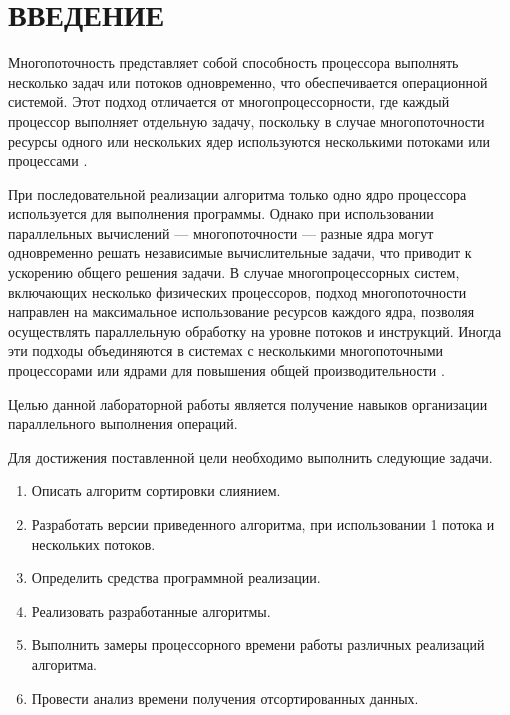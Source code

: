\chapter*{\hfill{\centering  ВВЕДЕНИЕ}\hfill}

Многопоточность представляет собой способность процессора выполнять несколько задач или потоков одновременно, что обеспечивается операционной системой. Этот подход отличается от многопроцессорности, где каждый процессор выполняет отдельную задачу, поскольку в случае многопоточности ресурсы одного или нескольких ядер используются несколькими потоками или процессами \cite{muti-thread}.

При последовательной реализации алгоритма только одно ядро процессора используется для выполнения программы. Однако при использовании параллельных вычислений --- многопоточности --- разные ядра могут одновременно решать независимые вычислительные задачи, что приводит к ускорению общего решения задачи.
В случае многопроцессорных систем, включающих несколько физических процессоров, подход многопоточности направлен на максимальное использование ресурсов каждого ядра, позволяя осуществлять параллельную обработку на уровне потоков и инструкций. Иногда эти подходы объединяются в системах с несколькими многопоточными процессорами или ядрами для повышения общей производительности \cite{muti-thread}.


Целью данной лабораторной работы является получение навыков организации параллельного выполнения операций.

Для достижения поставленной цели необходимо выполнить следующие задачи.
\label{sec:targets}
\begin{enumerate}
	\item Описать алгоритм сортировки слиянием.
	\item Разработать версии  приведенного алгоритма, при использовании 1 потока и нескольких потоков.
	\item Определить средства программной реализации.
	\item Реализовать разработанные алгоритмы.
	\item Выполнить замеры процессорного времени работы различных реализаций алгоритма.
	\item Провести анализ времени получения отсортированных данных.
\end{enumerate}